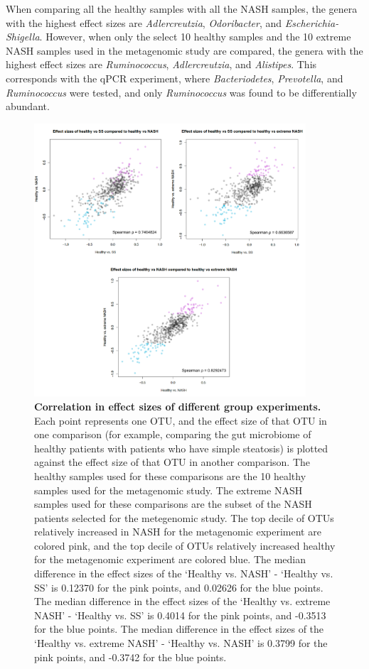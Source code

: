 When comparing all the healthy samples with all the NASH samples, the genera with the highest effect sizes are \textit{Adlercreutzia}, \textit{Odoribacter}, and \textit{Escherichia-Shigella}. However, when only the select 10 healthy samples and the 10 extreme NASH samples used in the metagenomic study are compared, the genera with the highest effect sizes are \textit{Ruminococcus}, \textit{Adlercreutzia}, and \textit{Alistipes}. This corresponds with the qPCR experiment, where \textit{Bacteriodetes}, \textit{Prevotella}, and \textit{Ruminococcus} were tested, and only \textit{Ruminococcus} was found to be differentially abundant.

\begin{figure}[h]
\begin{center}
\includegraphics[width=0.9\textwidth]{nafld_16s_effect_sizes.png}
\caption[Correlation in effect sizes of different group experiments.]{\textbf{Correlation in effect sizes of different group experiments.} Each point represents one OTU, and the effect size of that OTU in one comparison (for example, comparing the gut microbiome of healthy patients with patients who have simple steatosis) is plotted against the effect size of that OTU in another comparison. The healthy samples used for these comparisons are the 10 healthy samples used for the metagenomic study. The extreme NASH samples used for these comparisons are the subset of the NASH patients selected for the metegenomic study. The top decile of OTUs relatively increased in NASH for the metagenomic experiment are colored pink, and the top decile of OTUs relatively increased healthy for the metagenomic experiment are colored blue. The median difference in the effect sizes of the `Healthy vs. NASH' - `Healthy vs. SS' is 0.12370 for the pink points, and 0.02626 for the blue points. The median difference in the effect sizes of the `Healthy vs. extreme NASH' - `Healthy vs. SS' is 0.4014 for the pink points, and -0.3513 for the blue points. The median difference in the effect sizes of the `Healthy vs. extreme NASH' - `Healthy vs. NASH' is 0.3799 for the pink points, and -0.3742 for the blue points. }

\end{center}
\end{figure}
